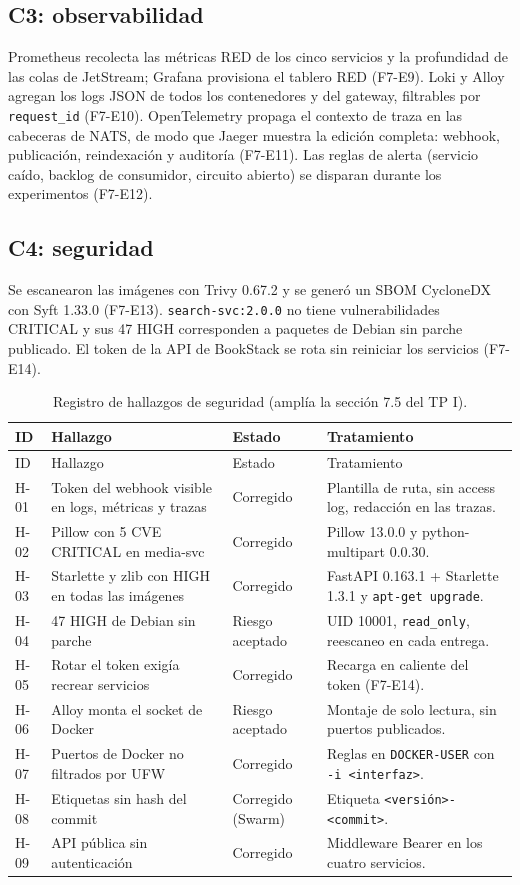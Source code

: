 \documentclass[11pt,a4paper]{article}
\begin{document}
\subsection{C3: observabilidad}
Prometheus recolecta las métricas RED de los cinco servicios y la profundidad de las colas de JetStream; Grafana provisiona el tablero RED (F7-E9). Loki y Alloy agregan los logs JSON de todos los contenedores y del gateway, filtrables por \texttt{request\_id} (F7-E10). OpenTelemetry propaga el contexto de traza en las cabeceras de NATS, de modo que Jaeger muestra la edición completa: webhook, publicación, reindexación y auditoría (F7-E11). Las reglas de alerta (servicio caído, backlog de consumidor, circuito abierto) se disparan durante los experimentos (F7-E12).

\subsection{C4: seguridad}
Se escanearon las imágenes con Trivy 0.67.2 y se generó un SBOM CycloneDX con Syft 1.33.0 (F7-E13). \texttt{search-svc:2.0.0} no tiene vulnerabilidades CRITICAL y sus 47 HIGH corresponden a paquetes de Debian sin parche publicado. El token de la API de BookStack se rota sin reiniciar los servicios (F7-E14).

\begin{longtable}{>{\raggedright}p{0.8cm} >{\raggedright}p{4.2cm} >{\raggedright}p{1.5cm} >{\raggedright\arraybackslash}p{8cm}}
\caption{Registro de hallazgos de seguridad (amplía la sección 7.5 del TP I).}\\
\toprule ID & Hallazgo & Estado & Tratamiento \\ \midrule \endfirsthead
\toprule ID & Hallazgo & Estado & Tratamiento \\ \midrule \endhead
H-01 & Token del webhook visible en logs, métricas y trazas & Corregido & Plantilla de ruta, sin access log, redacción en las trazas. \\
H-02 & Pillow con 5 CVE CRITICAL en media-svc & Corregido & Pillow 13.0.0 y python-multipart 0.0.30. \\
H-03 & Starlette y zlib con HIGH en todas las imágenes & Corregido & FastAPI 0.163.1 + Starlette 1.3.1 y \texttt{apt-get upgrade}. \\
H-04 & 47 HIGH de Debian sin parche & Riesgo aceptado & UID 10001, \texttt{read\_only}, reescaneo en cada entrega. \\
H-05 & Rotar el token exigía recrear servicios & Corregido & Recarga en caliente del token (F7-E14). \\
H-06 & Alloy monta el socket de Docker & Riesgo aceptado & Montaje de solo lectura, sin puertos publicados. \\
H-07 & Puertos de Docker no filtrados por UFW & Corregido & Reglas en \texttt{DOCKER-USER} con \texttt{-i <interfaz>}. \\
H-08 & Etiquetas sin hash del commit & Corregido (Swarm) & Etiqueta \texttt{<versión>-<commit>}. \\
H-09 & API pública sin autenticación & Corregido & Middleware Bearer en los cuatro servicios. \\
\bottomrule
\end{longtable}
\end{document}
